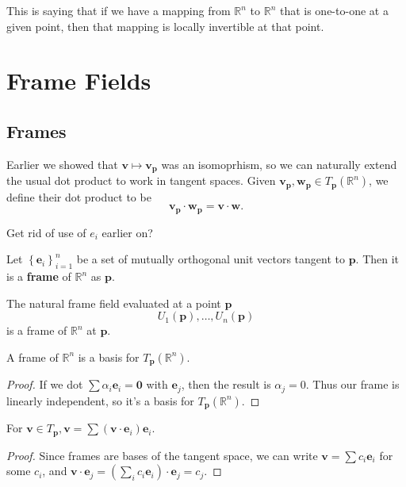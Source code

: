 \documentclass[10pt]{report}
\begin{document}
This is saying that if we have a mapping from $\mathbb{R}^n$ to $\mathbb{R}^n$ that is one-to-one at a given point, then that mapping is locally invertible at that point.


\chapter{Frame Fields}


\section{Frames}

Earlier we showed that $\mathbf{v}\mapsto \mathbf{v}_{\mathbf{p}} $ was an isomoprhism, so we can naturally extend the usual dot product to work in tangent spaces. Given $\mathbf{v}_{\mathbf{p}}, \mathbf{w}_{\mathbf{p}} \in T_{\mathbf{p}}(\mathbb{R}^n)$, we define their dot product to be
\[
\mathbf{v}_{\mathbf{p}}\cdot \mathbf{w}_{\mathbf{p}} = \mathbf{v} \cdot \mathbf{w}.
\] 

{\color{red}Get rid of use of $e_i$ earlier on?}

\begin{defn}[]
Let $\left\{ \mathbf{e}_i \right\}_{i=1}^n$ be a set of mutually orthogonal unit vectors tangent to $\mathbf{p}$. Then it is a \textbf{frame} of $\mathbb{R}^n$ as $\mathbf{p}$.
\end{defn}

\begin{ex}[]
	The natural frame field evaluated at a point $\mathbf{p}$ 
	\[
		U_1(\mathbf{p}), \dots, U_n(\mathbf{p})
	\] is a frame of $\mathbb{R}^n$ at $\mathbf{p}$.
\end{ex}

\begin{lem}
	A frame of $\mathbb{R}^n$ is a basis for $T_{\mathbf{p}}(\mathbb{R}^n)$.
\end{lem}
\begin{proof}
	If we dot $\sum \alpha_i \mathbf{e}_i =\mathbf{0}$ with $\mathbf{e}_j$, then the result is $\alpha_j=0$. Thus our frame is linearly independent, so it's a basis for $T_{\mathbf{p}}(\mathbb{R}^n)$.
\end{proof}

\begin{thrm}[]
	For $\mathbf{v} \in T_{\mathbf{p}}, $$\mathbf{v} = \sum (\mathbf{v}\cdot \mathbf{e}_i)\mathbf{e}_i$.
\end{thrm}
\begin{proof}
	Since frames are bases of the tangent space, we can write $\mathbf{v} = \sum c_i \mathbf{e}_i$ for some $c_i$, and $\mathbf{v}\cdot \mathbf{e}_j = (\sum_i c_i \mathbf{e}_i)\cdot \mathbf{e}_j = c_j$.
\end{proof}
\end{document}
